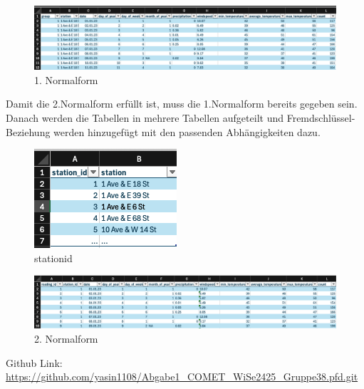\documentclass{article}
\begin{document}
\begin{figure}[htbp]
    \hspace{-2.5cm}
    \includegraphics[width=1.5\linewidth]{Normalform 1.png}
    \caption{1. Normalform}
    \label{fig:enter-label}
\end{figure}
\newpage

Damit die 2.Normalform erfüllt ist, muss die 1.Normalform bereits gegeben sein. Danach werden die Tabellen in mehrere  Tabellen aufgeteilt und Fremdschlüssel-Beziehung werden hinzugefügt mit den passenden Abhängigkeiten dazu. 

\begin{figure}[htbp]
    \centering
    \includegraphics[width=0.5\linewidth]{Station id1.png}
    \caption{stationid}
\end{figure}

\begin{figure}[htbp]
    \hspace{-2.5cm}
    \includegraphics[width=1.5\linewidth]{Normalform2.png}
    \caption{2. Normalform}
\end{figure}


\newpage







Github Link:\\
\url{https://github.com/yasin1108/Abgabe1_COMET_WiSe2425_Gruppe38.pfd.git}

      
\end{document}
